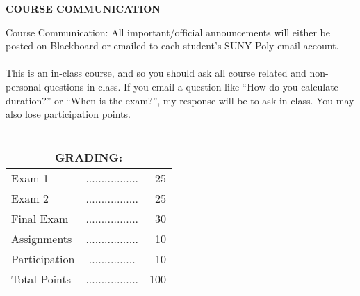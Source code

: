 \documentclass{article}
\begin{document}
\begin{center}
{\bf COURSE COMMUNICATION}
\end{center}
Course Communication: All important/official announcements will either be posted on Blackboard
or emailed to each student's SUNY Poly email account.\\
\\
This is an in-class course, and so you should ask all course related and non-personal questions in class.  If you email a question like ``How do you calculate duration?'' or ``When is the exam?'', my response will be to ask in class.  You may also lose participation points.\\
\\
\begin{center}
\begin{tabular}{lcr}
\multicolumn{3}{c}{\bf GRADING:} \\ \hline
Exam 1 & ................. & 25 \\

Exam 2 & ................. & 25 \\

Final Exam & ................. & 30 \\


Assignments & ................. &  10\\
Participation & ............... &  10\\
  



Total Points & ................. & 100\\
\end{tabular}
\end{center}
\end{document}
